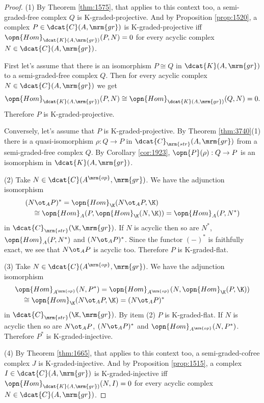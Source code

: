 \begin{proof} \mbox{}

\smallskip \noindent
(1) By Theorem \ref{thm:1575}, that applies to this context too, a 
semi-graded-free complex $Q$ is K-graded-projective. And by Proposition 
\ref{prop:1520}, a complex $P \in \dcat{C}(A, \mrm{gr})$ is 
K-graded-projective iff $\opn{Hom}_{\dcat{K}(A, \mrm{gr})}(P, N) = 0$ for every 
acyclic complex $N \in \dcat{C}(A, \mrm{gr})$.

First let's assume that there is an isomorphism $P \cong Q$ in 
$\dcat{K}(A, \mrm{gr})$ to a semi-graded-free complex $Q$.
Then for every acyclic complex 
$N \in \dcat{C}(A, \mrm{gr})$ we get 
\[ \opn{Hom}_{\dcat{K}(A, \mrm{gr})}(P, N) \cong 
\opn{Hom}_{\dcat{K}(A, \mrm{gr})}(Q, N) = 0 . \]
Therefore $P$ is K-graded-projective.

Conversely, let's assume that $P$ is K-graded-projective. By Theorem 
\ref{thm:3740}(1) there is a quasi-isomorphism
$\rho : Q \to P$ in $\dcat{C}_{\mrm{str}}(A, \mrm{gr})$ from a 
semi-graded-free complex $Q$. By Corollary \ref{cor:1923}, 
$\opn{P}(\rho) : Q \to P$ is an 
isomorphism in $\dcat{K}(A, \mrm{gr})$.

\medskip \noindent
(2) Take $N \in \dcat{C}(A^{\mrm{op}}, \mrm{gr})$. 
We have the adjunction isomorphism
\[ \begin{aligned}
& (N \ot_A P)^* = \opn{Hom}_{\K}(N \ot_A P, \K) 
\\
& \quad \cong
\opn{Hom}_{A}(P, \opn{Hom}_{\K}(N, \K)) = \opn{Hom}_{A}(P, N^*) 
\end{aligned} \]
in $\dcat{C}_{\mrm{str}}(\K, \mrm{gr})$. 
If $N$ is acyclic then so are $N^*$, 
$\opn{Hom}_{A}(P, N^*)$ and $(N \ot_A P)^*$.
Since the functor $(-)^*$ is faithfully exact, we see that 
$N \ot_A P$ is acyclic too. Therefore $P$ is K-graded-flat.

\medskip \noindent
(3) Take $N \in \dcat{C}(A^{\mrm{op}}, \mrm{gr})$. 
We have the adjunction isomorphism
\[ \begin{aligned}
& \opn{Hom}_{A^{\mrm{op}}}(N, P^*) =
\opn{Hom}_{A^{\mrm{op}}}(N, \opn{Hom}_{\K}(P, \K))
\\
& \quad \cong \opn{Hom}_{\K}(N \ot_A P, \K) = (N \ot_A P)^* 
\end{aligned} \]
in $\dcat{C}_{\mrm{str}}(\K, \mrm{gr})$. 
By item (2) $P$ is K-graded-flat. If $N$ is acyclic then so are
$N \ot_A P$, $(N \ot_A P)^*$ and $\opn{Hom}_{A^{\mrm{op}}}(N, P^*)$. 
Therefore $P^*$ is K-graded-injective.

\medskip \noindent
(4) By Theorem \ref{thm:1665}, that applies to this context too, a 
semi-graded-cofree complex $J$ is K-graded-injective. And by Proposition 
\ref{prop:1515}, a complex 
$I \in \dcat{C}(A, \mrm{gr})$ is K-graded-injective iff
$\opn{Hom}_{\dcat{K}(A, \mrm{gr})}(N, I) = 0$ for every acyclic complex 
$N \in \dcat{C}(A, \mrm{gr})$.


\end{proof}
